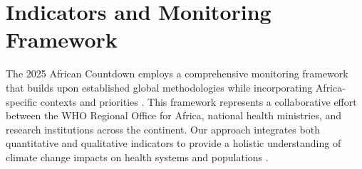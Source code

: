 \section{Indicators and Monitoring Framework}

The 2025 African Countdown employs a comprehensive monitoring framework that builds upon established global methodologies \citep{lancet2024,lancet_africa2023} while incorporating Africa-specific contexts and priorities \citep{who2024}. This framework represents a collaborative effort between the WHO Regional Office for Africa, national health ministries, and research institutions across the continent. Our approach integrates both quantitative and qualitative indicators to provide a holistic understanding of climate change impacts on health systems and populations \citep{romanello2023}.

